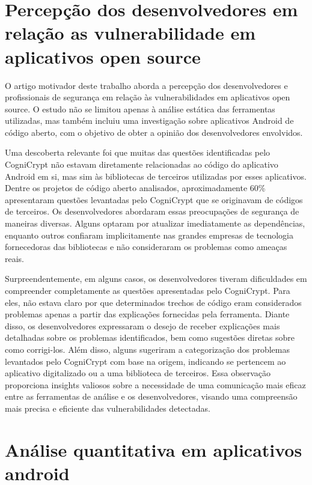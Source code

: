 

\section{Percepção dos desenvolvedores em relação as vulnerabilidade em aplicativos open source}

O artigo motivador deste trabalho \cite{perception_developers} aborda a percepção dos desenvolvedores e profissionais de segurança em relação às vulnerabilidades em aplicativos open source. O estudo não se limitou apenas à análise estática das ferramentas utilizadas, mas também incluiu uma investigação sobre aplicativos Android de código aberto, com o objetivo de obter a opinião dos desenvolvedores envolvidos. \cite{perception_developers}

Uma descoberta relevante foi que muitas das questões identificadas pelo CogniCrypt não estavam diretamente relacionadas ao código do aplicativo Android em si, mas sim às bibliotecas de terceiros utilizadas por esses aplicativos. \cite{perception_developers} Dentre os projetos de código aberto analisados, aproximadamente 60\% apresentaram questões levantadas pelo CogniCrypt que se originavam de códigos de terceiros. Os desenvolvedores abordaram essas preocupações de segurança de maneiras diversas. Alguns optaram por atualizar imediatamente as dependências, enquanto outros confiaram implicitamente nas grandes empresas de tecnologia fornecedoras das bibliotecas e não consideraram os problemas como ameaças reais.

Surpreendentemente, em alguns casos, os desenvolvedores tiveram dificuldades em compreender completamente as questões apresentadas pelo CogniCrypt. Para eles, não estava claro por que determinados trechos de código eram considerados problemas apenas a partir das explicações fornecidas pela ferramenta. Diante disso, os desenvolvedores expressaram o desejo de receber explicações mais detalhadas sobre os problemas identificados, bem como sugestões diretas sobre como corrigi-los. Além disso, alguns sugeriram a categorização dos problemas levantados pelo CogniCrypt com base na origem, indicando se pertencem ao aplicativo digitalizado ou a uma biblioteca de terceiros. Essa observação proporciona insights valiosos sobre a necessidade de uma comunicação mais eficaz entre as ferramentas de análise e os desenvolvedores, visando uma compreensão mais precisa e eficiente das vulnerabilidades detectadas. \cite{perception_developers}

\section{Análise quantitativa em aplicativos android}

